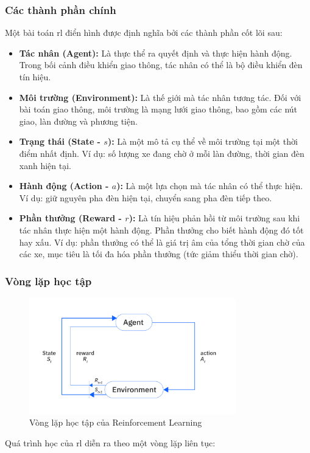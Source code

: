 \begin{enumerate}
\subsubsection{Các thành phần chính}
Một bài toán \ac{rl} điển hình được định nghĩa bởi các thành phần cốt lõi sau:
\begin{itemize}
    \item \textbf{Tác nhân (Agent):} Là thực thể ra quyết định và thực hiện hành
        động. Trong bối cảnh điều khiển giao thông, tác nhân có thể là bộ điều
        khiển đèn tín hiệu.

    \item \textbf{Môi trường (Environment):} Là thế giới mà tác nhân tương tác. Đối
        với bài toán giao thông, môi trường là mạng lưới giao thông, bao gồm các
        nút giao, làn đường và phương tiện.

    \item \textbf{Trạng thái (State - $s$):} Là một mô tả cụ thể về môi trường
        tại một thời điểm nhất định. Ví dụ: số lượng xe đang chờ ở mỗi làn đường,
        thời gian đèn xanh hiện tại.

    \item \textbf{Hành động (Action - $a$):} Là một lựa chọn mà tác nhân có thể
        thực hiện. Ví dụ: giữ nguyên pha đèn hiện tại, chuyển sang pha đèn tiếp theo.

    \item \textbf{Phần thưởng (Reward - $r$):} Là tín hiệu phản hồi từ môi
        trường sau khi tác nhân thực hiện một hành động. Phần thưởng cho biết hành
        động đó tốt hay xấu. Ví dụ: phần thưởng có thể là giá trị âm của tổng thời
        gian chờ của các xe, mục tiêu là tối đa hóa phần thưởng (tức giảm thiểu thời
        gian chờ).
\end{itemize}

\subsubsection{Vòng lặp học tập}

\begin{figure}[!htp]
    \centering
    \includegraphics[width=0.8\textwidth]{img/RL_components.png}
    \caption{Vòng lặp học tập của Reinforcement Learning \cite{IBM2024}}
    \label{fig:RL-components}
\end{figure}
Quá trình học của \ac{rl} diễn ra theo một vòng lặp liên tục:


\end{enumerate}
